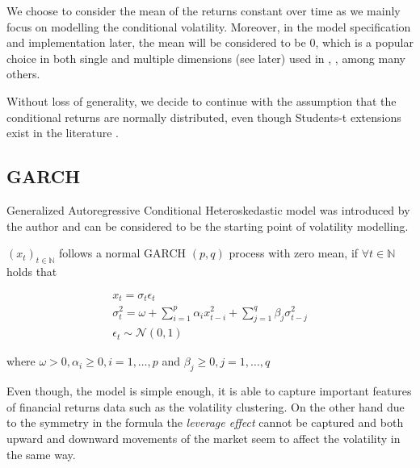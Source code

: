 \documentclass[a4paper, oneside]{discothesis}
\begin{document}
  \begin{mdframed}\begin{remark}
We choose to consider the mean of the returns constant over time as we mainly focus on modelling the conditional volatility. Moreover, in the model specification and implementation later, the mean will be considered to be $0$, which is a popular choice in both single and multiple dimensions (see later) used in \cite{boulet}, \cite{fgd}, \cite{engle-multidimensions} among many others.
\end{remark}\end{mdframed}  

  \begin{mdframed}\begin{remark}
Without loss of generality, we decide to continue with the assumption that the conditional returns are normally distributed, even though Students-t extensions exist in the literature \cite{garch-t}.
\end{remark}\end{mdframed}  


\subsection{GARCH}

Generalized Autoregressive Conditional Heteroskedastic model was introduced by the author \cite{garch} and can be considered to be the starting point of volatility modelling.

\begin{definition}\label{thm:garch_def}

$\left(x_t\right)_{t\in \mathbb{N}}$ follows a normal GARCH $\left(p, q\right)$ process with zero mean, if $\forall t \in \mathbb{N}$ holds that

\begin{gather*}\label{eq:1}
x_t = \sigma_t \epsilon_t \\
\sigma^2_t = \omega + \sum_{i=1}^p\alpha_i x_{t-i}^2 + \sum_{j=1}^q \beta_j 
\sigma_{t-j}^2  \\
\epsilon_t \sim \mathcal{N}\left(0,1\right)
\end{gather*}

\end{definition}
where $\omega > 0, \alpha_i \geq 0, i = 1,\dots,p$ and $\beta_j \geq 0, j = 1,\dots,q$

Even though, the model is simple enough, it is able to capture important features of financial returns data such as the volatility clustering. On the other hand due to the symmetry in the formula the \textit{leverage effect} cannot be captured and both upward and downward movements of the market seem to affect the volatility in the same way.
\end{document}
